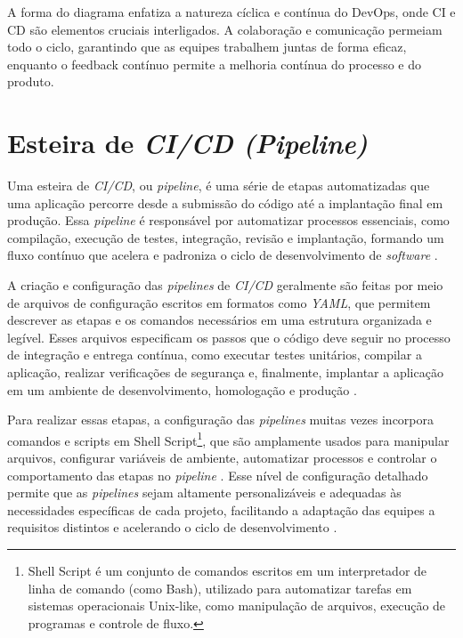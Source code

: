 A forma do diagrama enfatiza a natureza cíclica e contínua do DevOps, onde CI e CD são elementos cruciais interligados. A colaboração e comunicação permeiam todo o ciclo, garantindo que as equipes trabalhem juntas de forma eficaz, enquanto o feedback contínuo permite a melhoria contínua do processo e do produto.

\section{Esteira de \textit{CI/CD (Pipeline)}}\label{sec:pipelines}

Uma esteira de \textit{CI/CD}, ou \textit{pipeline}, é uma série de etapas automatizadas que uma aplicação percorre desde a submissão do código até a implantação final em produção. Essa \textit{pipeline} é responsável por automatizar processos essenciais, como compilação, execução de testes, integração, revisão e implantação, formando um fluxo contínuo que acelera e padroniza o ciclo de desenvolvimento de \textit{software} \cite{Shahin2017}.

A criação e configuração das \textit{pipelines} de \textit{CI/CD} geralmente são feitas por meio de arquivos de configuração escritos em formatos como \textit{YAML}, que permitem descrever as etapas e os comandos necessários em uma estrutura organizada e legível. Esses arquivos especificam os passos que o código deve seguir no processo de integração e entrega contínua, como executar testes unitários, compilar a aplicação, realizar verificações de segurança e, finalmente, implantar a aplicação em um ambiente de desenvolvimento, homologação e produção \cite{GetStartedWithGitLab}. 

Para realizar essas etapas, a configuração das \textit{pipelines} muitas vezes incorpora comandos e scripts em Shell Script\footnote{Shell Script é um conjunto de comandos escritos em um interpretador de linha de comando (como Bash), utilizado para automatizar tarefas em sistemas operacionais Unix-like, como manipulação de arquivos, execução de programas e controle de fluxo.}, que são amplamente usados para manipular arquivos, configurar variáveis de ambiente, automatizar processos e controlar o comportamento das etapas no \textit{pipeline} \cite{GetStartedWithGitLab}. Esse nível de configuração detalhado permite que as \textit{pipelines} sejam altamente personalizáveis e adequadas às necessidades específicas de cada projeto, facilitando a adaptação das equipes a requisitos distintos e acelerando o ciclo de desenvolvimento \cite{Bass2020}.

